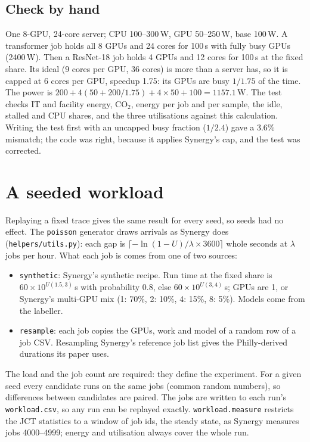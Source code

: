 \documentclass[11pt,a4paper]{article}
\newcommand{\code}[1]{\texttt{#1}}
\begin{document}
\subsection{Check by hand}
One 8-GPU, 24-core server; CPU 100--300\,W, GPU 50--250\,W, base 100\,W. A transformer job holds all 8 GPUs and 24
cores for 100\,s with fully busy GPUs (2400\,W). Then a ResNet-18 job holds 4 GPUs and 12 cores for 100\,s at the
fixed share. Its ideal (9 cores per GPU, 36 cores) is more than a server has, so it is capped at 6 cores per GPU,
speedup 1.75: its GPUs are busy $1/1.75$ of the time. The power is
$200 + 4(50 + 200/1.75) + 4 \times 50 + 100 = 1157.1$\,W. The test checks IT and facility energy, CO$_2$, energy
per job and per sample, the idle, stalled and CPU shares, and the three utilisations against this calculation.
Writing the test first with an uncapped busy fraction ($1/2.4$) gave a 3.6\% mismatch; the code was right,
because it applies Synergy's cap, and the test was corrected.

\section{A seeded workload}

Replaying a fixed trace gives the same result for every seed, so seeds had no effect. The \code{poisson}
generator draws arrivals as Synergy does (\code{helpers/utils.py}): each gap is
$\lceil -\ln(1-U)/\lambda \times 3600 \rceil$ whole seconds at $\lambda$ jobs per hour. What each job is comes
from one of two sources:
\begin{itemize}
  \item \code{synthetic}: Synergy's synthetic recipe. Run time at the fixed share is $60 \times 10^{U(1.5,3)}$\,s
        with probability 0.8, else $60 \times 10^{U(3,4)}$\,s; GPUs are 1, or Synergy's multi-GPU mix (1: 70\%,
        2: 10\%, 4: 15\%, 8: 5\%). Models come from the labeller.
  \item \code{resample}: each job copies the GPUs, work and model of a random row of a job CSV. Resampling
        Synergy's reference job list gives the Philly-derived durations its paper uses.
\end{itemize}
The load and the job count are required: they define the experiment. For a given seed every candidate runs on
the same jobs (common random numbers), so differences between candidates are paired. The jobs are written to
each run's \code{workload.csv}, so any run can be replayed exactly. \code{workload.measure} restricts the JCT
statistics to a window of job ids, the steady state, as Synergy measures jobs 4000--4999; energy and utilisation
always cover the whole run.
\end{document}
